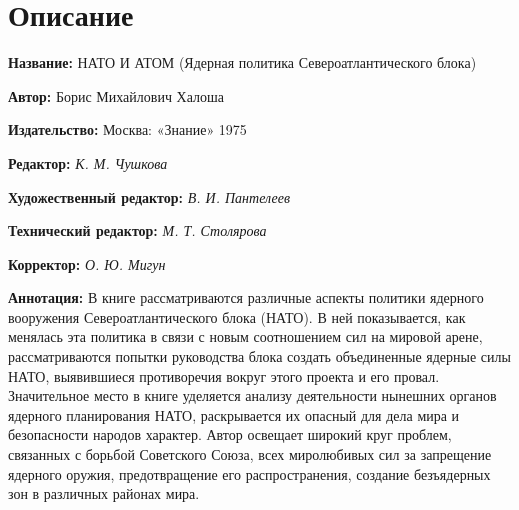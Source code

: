 \documentclass[12pt, a4paper, openany]{book}
\begin{document}
	
		\section*{Описание}
	
	{\bf Название:} НАТО И АТОМ (Ядерная политика Североатлантического блока) 
	
{\bf Автор:} Борис Михайлович Халоша
	
{\bf Издательство:} Москва: «Знание» 1975
	
		{\bf Редактор:} \textit{К. М. Чушкова}
	
		{\bf Художественный редактор:} \textit{В. И. Пантелеев}
	
		{\bf Технический редактор:} \textit{М. Т. Столярова}
	
		{\bf Корректор:} \textit{О. Ю. Мигун}
	
		{\bf Аннотация:} В книге рассматриваются различные аспекты политики ядерного вооружения Североатлантического блока (НАТО). В ней показывается, как менялась эта политика в связи с новым соотношением сил на мировой арене, рассматриваются попытки руководства блока создать объединенные ядерные силы НАТО, выявившиеся противоречия вокруг этого проекта и его провал. Значительное место в книге уделяется анализу деятельности нынешних органов ядерного планирования НАТО, раскрывается их опасный для дела мира и безопасности народов характер. Автор освещает широкий круг проблем, связанных с борьбой Советского Союза, всех миролюбивых сил за запрещение ядерного оружия, предотвращение его распространения, создание безъядерных зон в различных районах мира. 
		\thispagestyle{empty} %

	
\end{document}
